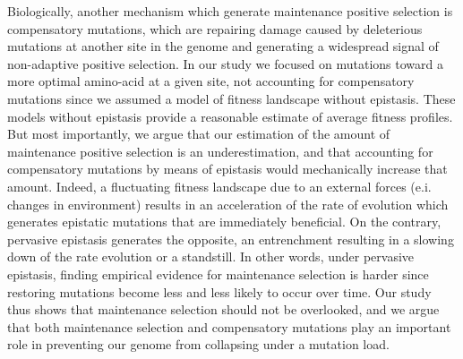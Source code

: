 \documentclass{article}
\begin{document}
    Biologically, another mechanism which generate maintenance positive selection is compensatory mutations, which are repairing damage caused by deleterious mutations at another site in the genome and generating a widespread signal of non-adaptive positive selection\cite{hartl_compensatory_1996, pollock_strong_2014, starr_epistasis_2016}.
    In our study we focused on mutations toward a more optimal amino-acid at a given site, not accounting for compensatory mutations since we assumed a model of fitness landscape without epistasis.
    These models without epistasis provide a reasonable estimate of average fitness profiles\cite{youssef_consequences_2020}.
    But most importantly, we argue that our estimation of the amount of maintenance positive selection is an underestimation, and that accounting for compensatory mutations by means of epistasis would mechanically increase that amount.
    Indeed, a fluctuating fitness landscape due to an external forces (e.i. changes in environment) results in an acceleration of the rate of evolution\cite{ rodrigue_detecting_2017, rodrigue_bayesian_2021} which generates epistatic mutations that are immediately beneficial\cite{gong_epistatically_2014}.
    On the contrary, pervasive epistasis generates the opposite, an entrenchment\cite{goldstein_evolutionary_2004, goldstein_nonadaptive_2015} resulting in a slowing down of the rate evolution\cite{rodrigue_detecting_2017, patel_epistasis_2022} or a standstill\cite{youssef_evolution_2022}.
    In other words, under pervasive epistasis, finding empirical evidence for maintenance selection is harder since restoring mutations become less and less likely to occur over time\cite{goldstein_nonadaptive_2015, goldstein_sequence_2017, park_epistatic_2022}.
    Our study thus shows that maintenance selection should not be overlooked, and we argue that both maintenance selection and compensatory mutations play an important role in preventing our genome from collapsing under a mutation load.

\end{document}
